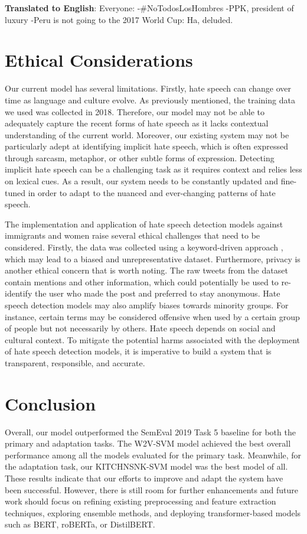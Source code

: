 \documentclass[11pt,a4paper]{article}
\begin{document}
\begin{displayquote}
    \textbf{Translated to English}: Everyone: -\#NoTodosLosHombres -PPK, president of luxury -Peru is not going to the 2017 World Cup: Ha, deluded.
\end{displayquote}


\section{Ethical Considerations}
    Our current model has several limitations. Firstly, hate speech can change over time as language and culture evolve. As previously mentioned, the training data we used was collected in 2018. Therefore, our model may not be able to adequately capture the recent forms of hate speech as it lacks contextual understanding of the current world. Moreover, our existing system may not be particularly adept at identifying implicit hate speech, which is often expressed through sarcasm, metaphor, or other subtle forms of expression. Detecting implicit hate speech can be a challenging task as it requires context and relies less on lexical cues. As a result, our system needs to be constantly updated and fine-tuned in order to adapt to the nuanced and ever-changing patterns of hate speech.
	 
   The implementation and application of hate speech detection models against immigrants and women raise several ethical challenges that need to be considered. Firstly, the data was collected using a keyword-driven approach \citep{basile-etal-2019-semeval}, which may lead to a biased and unrepresentative dataset. Furthermore, privacy is another ethical concern that is worth noting. The raw tweets from the dataset contain mentions and other information, which could potentially be used to re-identify the user who made the post and preferred to stay anonymous. Hate speech detection models may also amplify biases towards minority groups. For instance, certain terms may be considered offensive when used by a certain group of people but not necessarily by others. Hate speech depends on social and cultural context. To mitigate the potential harms associated with the deployment of hate speech detection models, it is imperative to build a system that is transparent, responsible, and accurate.





\section{Conclusion}
Overall, our model outperformed the SemEval 2019 Task 5 baseline for both the primary and adaptation tasks. The W2V-SVM model achieved the best overall performance among all the models evaluated for the primary task. Meanwhile, for the adaptation task, our KITCHNSNK-SVM model was the best model of all. These results indicate that our efforts to improve and adapt the system have been successful. However, there is still room for further enhancements and future work should focus on refining existing preprocessing and feature extraction techniques, exploring ensemble methods, and deploying transformer-based models such as BERT, roBERTa, or DistilBERT.



\nocite{*}


\end{document}
